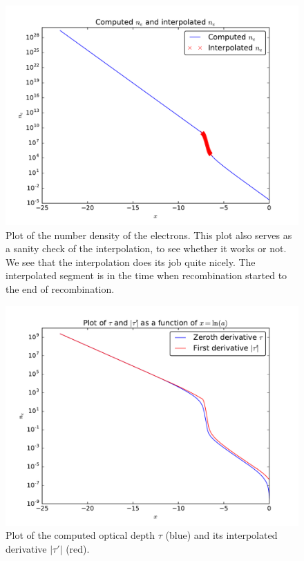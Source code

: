 \documentclass[12pt]{article}
\begin{document}
\begin{figure}[H]
\centering
\includegraphics[width=\linewidth]{Plots/InterpolatedElectronDensity.pdf}
\caption{Plot of the number density of the electrons. This plot also serves as a sanity check of the interpolation, to see whether it works or not. We see that the interpolation does its job quite nicely. The interpolated segment is in the time when recombination started to the end of recombination.}
\end{figure} 

\begin{figure}[H]
\centering
\includegraphics[width=\linewidth]{Plots/FirstDerivativeTau.pdf}
\caption{Plot of the computed optical depth $\tau$  (blue) and its interpolated derivative $|\tau'|$ (red).}
\end{figure}
\end{document}
